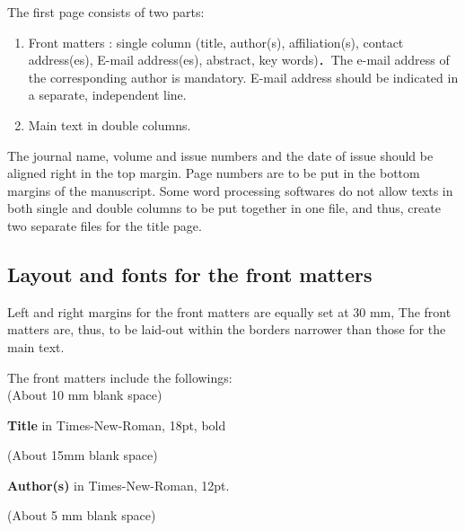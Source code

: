 \documentclass[english]{jjsce}
\begin{document}
The first page consists of two parts:
\begin{enumerate}[label=(\alph*)]
 \item Front matters : single column (title, author(s),
affiliation(s), contact address(es), E-mail address(es), abstract, key words)．The e-mail address of the corresponding author is mandatory.
E-mail address should be indicated in a separate,
independent line.\\[-20pt]
 \item Main text in double columns.\\[-20pt]
\end{enumerate}

The journal name, volume and issue numbers and
the date of issue should be aligned right in the top
margin. Page numbers are to be put in the bottom
margins of the manuscript. Some word processing
softwares do not allow texts in both single and double
columns to be put together in one file, and thus, create
two separate files for the title page.

\subsection{Layout and fonts for the front matters}

Left and right margins for the front matters are
equally set at 30 mm, The front matters are, thus, to
be laid-out within the borders narrower than those for
the main text.

The front matters include the followings:\\
\hspace*{40pt}(About 10 mm blank space)

\textbf{Title} in Times-New-Roman, 18pt, bold

\hspace*{40pt}(About 15mm blank space)

\textbf{Author(s)} in Times-New-Roman, 12pt.

\hspace*{40pt} (About 5 mm blank space)
\end{document}
